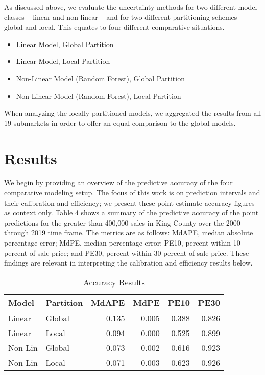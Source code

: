 \documentclass[colTwo]{anon}
\theoremstyle{definition}
\begin{document}
As discussed above, we evaluate the uncertainty methods for two different model classes -- linear and non-linear -- and for two different partitioning schemes -- global and local.  This equates to four different comparative situations. 

\begin{itemize}
\item Linear Model, Global Partition
\item Linear Model, Local Partition
\item Non-Linear Model (Random Forest), Global Partition
\item Non-Linear Model (Random Forest), Local Partition
\end{itemize}

When analyzing the locally partitioned models, we aggregated the results from all 19 submarkets in order to offer an equal comparison to the global models.

\section{Results}

We begin by providing an overview of the predictive accuracy of the four comparative modeling setup. The focus of this work is on prediction intervals and their calibration and efficiency; we present these point estimate accuracy figures as context only. Table 4 shows a summary of the predictive accuracy of the point predictions for the greater than 400,000 sales in King County over the 2000 through 2019 time frame. The metrics are as follows: MdAPE, median absolute percentage error; MdPE, median percentage error; PE10, percent within 10 percent of sale price; and PE30, percent within 30 percent of sale price. These findings are relevant in interpreting the calibration and efficiency results below. 

\begin{table}[h!]
\centering
\footnotesize
\begin{tabular}{l|l|r|r|r|r}
\hline
\textbf{Model} & \textbf{Partition} & \textbf{MdAPE} & \textbf{MdPE} & \textbf{PE10} & \textbf{PE30}\\
\hline
Linear & Global & 0.135 & 0.005 & 0.388 & 0.826\\
Linear & Local & 0.094 & 0.000 & 0.525 & 0.899\\
\hline
Non-Lin & Global & 0.073 & -0.002 & 0.616 & 0.923\\
Non-Lin & Local & 0.071 & -0.003 & 0.623 & 0.926\\
\hline
\end{tabular}
\caption{Accuracy Results}
\label{table:4}
\end{table}
\end{document}
